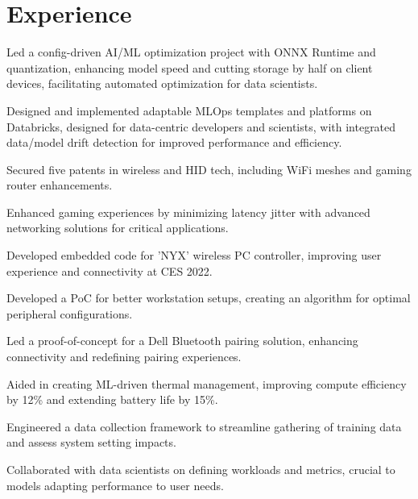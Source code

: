 \documentclass[]{resume-openfont}
\begin{document}
\begin{minipage}[t]{1\textwidth}
\section{Experience}
\titlerule
\vspace{2.5 mm}

\vspace{\topsep}
\begin{tightemize}
    \item Led a config-driven AI/ML optimization project with ONNX Runtime and quantization, enhancing model speed and cutting storage by half on client devices, facilitating automated optimization for data scientists.
    \item Designed and implemented adaptable MLOps templates and platforms on Databricks, designed for data-centric developers and scientists, with integrated data/model drift detection for improved performance and efficiency.
    \item Secured five patents in wireless and HID tech, including WiFi meshes and gaming router enhancements.
    \item Enhanced gaming experiences by minimizing latency jitter with advanced networking solutions for critical applications.
    \item Developed embedded code for 'NYX' wireless PC controller, improving user experience and connectivity at CES 2022.
    \item Developed a PoC for better workstation setups, creating an algorithm for optimal peripheral configurations.    
\end{tightemize}
\sectionsep

\begin{tightemize}
    \item Led a proof-of-concept for a Dell Bluetooth pairing solution, enhancing connectivity and redefining pairing experiences.
    \item Aided in creating ML-driven thermal management, improving compute efficiency by 12\% and extending battery life by 15\%.
    \item Engineered a data collection framework to streamline gathering of training data and assess system setting impacts.
    \item Collaborated with data scientists on defining workloads and metrics, crucial to models adapting performance to user needs.
\end{tightemize}
\sectionsep


\end{minipage}
\end{document}
